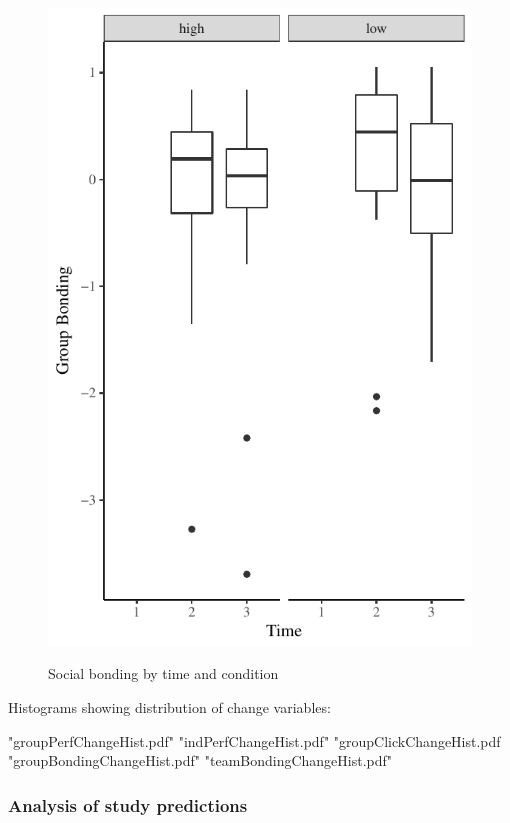 \begin{figure}
  \centering
  \includegraphics[width=0.5\linewidth,keepaspectratio] {images/prePostBondingPlot}
    \label{fig:prePostBondingPlot}
  \caption{Social bonding by time and condition}
\end{figure}






Histograms showing distribution of change variables:

"groupPerfChangeHist.pdf"
"indPerfChangeHist.pdf"
"groupClickChangeHist.pdf
"groupBondingChangeHist.pdf"
"teamBondingChangeHist.pdf"







\subsubsection{Analysis of study predictions}



